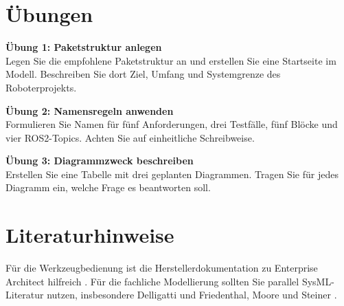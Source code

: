 \section{Übungen}
\begin{uebungbox}
\textbf{Übung 1: Paketstruktur anlegen}\\
Legen Sie die empfohlene Paketstruktur an und erstellen Sie eine Startseite im Modell. Beschreiben Sie dort Ziel, Umfang und Systemgrenze des Roboterprojekts.
\end{uebungbox}

\begin{uebungbox}
\textbf{Übung 2: Namensregeln anwenden}\\
Formulieren Sie Namen für fünf Anforderungen, drei Testfälle, fünf Blöcke und vier ROS2-Topics. Achten Sie auf einheitliche Schreibweise.
\end{uebungbox}

\begin{uebungbox}
\textbf{Übung 3: Diagrammzweck beschreiben}\\
Erstellen Sie eine Tabelle mit drei geplanten Diagrammen. Tragen Sie für jedes Diagramm ein, welche Frage es beantworten soll.
\end{uebungbox}

\section{Literaturhinweise}
Für die Werkzeugbedienung ist die Herstellerdokumentation zu Enterprise Architect hilfreich \cite{sparxea}. Für die fachliche Modellierung sollten Sie parallel SysML-Literatur nutzen, insbesondere Delligatti \cite{delligatti2014} und Friedenthal, Moore und Steiner \cite{friedenthal2014}.

